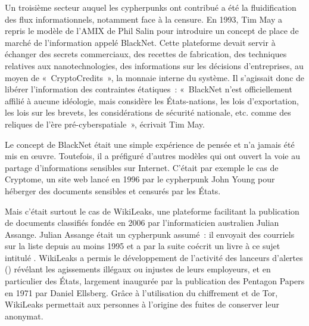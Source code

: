 Un troisième secteur auquel les cypherpunks ont contribué a été la fluidification des flux informationnels, notamment face à la censure. En 1993, Tim May a repris le modèle de l'AMIX de Phil Salin pour introduire un concept de place de marché de l'information appelé BlackNet. Cette plateforme devait servir à échanger des secrets commerciaux, des recettes de fabrication, des techniques relatives aux nanotechnologies, des informations sur les décisions d'entreprises, au moyen de «~CryptoCredits~», la monnaie interne du système. Il s'agissait donc de libérer l'information des contraintes étatiques~: «~BlackNet n'est officiellement affilié à aucune idéologie, mais considère les États-nations, les lois d'exportation, les lois sur les brevets, les considérations de sécurité nationale, etc. comme des reliques de l'ère pré-cyberspatiale~», écrivait Tim May.

Le concept de BlackNet était une simple expérience de pensée et n'a jamais été mis en œuvre. Toutefois, il a préfiguré d'autres modèles qui ont ouvert la voie au partage d'informations sensibles sur Internet. C'était par exemple le cas de Cryptome, un site web lancé en 1996 par le cypherpunk John Young pour héberger des documents sensibles et censurés par les États.

Mais c'était surtout le cas de WikiLeaks, une plateforme facilitant la publication de documents classifiés fondée en 2006 par l'informaticien australien Julian Assange. Julian Assange était un cypherpunk assumé~: il envoyait des courriels sur la liste depuis au moins 1995 et a par la suite coécrit un livre à ce sujet intitulé . WikiLeaks a permis le développement de l'activité des lanceurs d'alertes () révélant les agissements illégaux ou injustes de leurs employeurs, et en particulier des États, largement inaugurée par la publication des Pentagon Papers en 1971 par Daniel Ellsberg. Grâce à l'utilisation du chiffrement et de Tor, WikiLeaks permettait aux personnes à l'origine des fuites de conserver leur anonymat.

